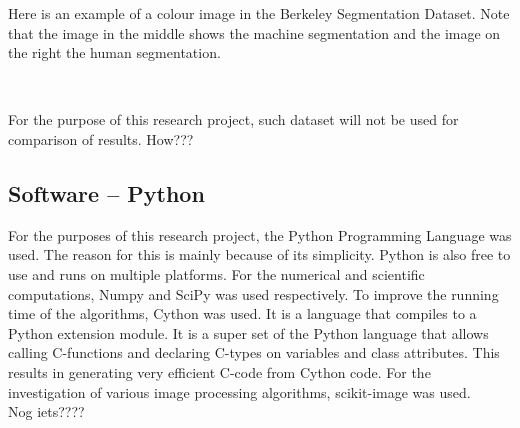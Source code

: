 \documentclass[a4paper,10pt]{article}
\begin{document}
Here is an example of a colour image in the Berkeley Segmentation Dataset.  Note
that the image in the middle shows the machine segmentation and the
image on the right the human segmentation.

\begin{figure}[H]
\centering
\mbox{ \quad
{} \quad
{}}
\end{figure}

For the purpose of this research project, such dataset will not be used for
comparison of results.  How???

\subsection{Software -- Python}
For the purposes of this research project, the Python Programming Language was
used.  The reason for this is mainly because of its simplicity.
Python is also free to use and runs on multiple platforms.  For the numerical
and scientific computations, Numpy and SciPy was used respectively.
To improve the running time of the algorithms, Cython was used.  It is a
language that compiles to a Python extension
module.  It is a super set of the Python language that allows calling
C-functions and declaring C-types on variables and class attributes.  This
results in generating very efficient C-code from Cython code.  For the
investigation of various image processing algorithms, scikit-image was used. \\
Nog iets????
\end{document}
